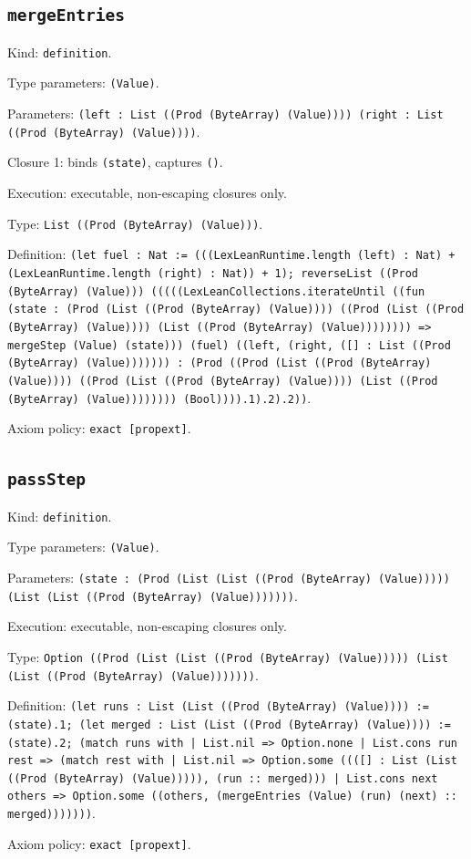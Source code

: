 \documentclass[11pt]{article}
\begin{document}
\subsection*{\texttt{mergeEntries}}
\noindent Kind: \texttt{definition}.\par
\noindent Type parameters: \texttt{(Value)}.\par
\noindent Parameters: \texttt{(left : List ((Prod (ByteArray) (Value)))) (right : List ((Prod (ByteArray) (Value))))}.\par
\noindent Closure 1: binds \texttt{(state)}, captures \texttt{()}.\par
\noindent Execution: executable, non-escaping closures only.\par
\noindent Type: \texttt{List ((Prod (ByteArray) (Value)))}.\par
\noindent Definition: \texttt{(let fuel : Nat := (((LexLeanRuntime.length (left) : Nat) + (LexLeanRuntime.length (right) : Nat)) + 1); reverseList ((Prod (ByteArray) (Value))) (((((LexLeanCollections.iterateUntil ((fun (state : (Prod (List ((Prod (ByteArray) (Value)))) ((Prod (List ((Prod (ByteArray) (Value)))) (List ((Prod (ByteArray) (Value)))))))) => mergeStep (Value) (state))) (fuel) ((left, (right, ([] : List ((Prod (ByteArray) (Value))))))) : (Prod ((Prod (List ((Prod (ByteArray) (Value)))) ((Prod (List ((Prod (ByteArray) (Value)))) (List ((Prod (ByteArray) (Value)))))))) (Bool)))).1).2).2))}.\par
\noindent Axiom policy: \texttt{exact [propext]}.\par
\subsection*{\texttt{passStep}}
\noindent Kind: \texttt{definition}.\par
\noindent Type parameters: \texttt{(Value)}.\par
\noindent Parameters: \texttt{(state : (Prod (List (List ((Prod (ByteArray) (Value))))) (List (List ((Prod (ByteArray) (Value)))))))}.\par
\noindent Execution: executable, non-escaping closures only.\par
\noindent Type: \texttt{Option ((Prod (List (List ((Prod (ByteArray) (Value))))) (List (List ((Prod (ByteArray) (Value)))))))}.\par
\noindent Definition: \texttt{(let runs : List (List ((Prod (ByteArray) (Value)))) := (state).1; (let merged : List (List ((Prod (ByteArray) (Value)))) := (state).2; (match runs with | List.nil => Option.none | List.cons run rest => (match rest with | List.nil => Option.some ((([] : List (List ((Prod (ByteArray) (Value))))), (run :: merged))) | List.cons next others => Option.some ((others, (mergeEntries (Value) (run) (next) :: merged)))))))}.\par
\noindent Axiom policy: \texttt{exact [propext]}.\par
\end{document}
